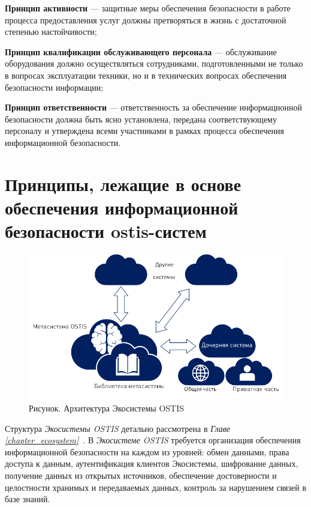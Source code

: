 \begin{textitemize}
	\item \textbf{Принцип активности} --- защитные меры обеспечения безопасности в работе процесса предоставления услуг должны претворяться в жизнь с достаточной степенью настойчивости;
	\item \textbf{Принцип квалификации обслуживающего персонала} --- обслуживание оборудования должно осуществляться сотрудниками, подготовленными не только в вопросах эксплуатации техники, но и в технических вопросах обеспечения безопасности информации;
	\item \textbf{Принцип ответственности} --- ответственность за обеспечение информационной безопасности должна быть ясно установлена, передана соответствующему персоналу и утверждена всеми участниками в рамках процесса обеспечения информационной безопасности.
\end{textitemize}

\section{Принципы, лежащие в основе обеспечения информационной безопасности ostis-систем}
\label{sec_security_principles}

\begin{figure}[H]
	\includegraphics[scale=0.9]{images/part7/chapter_security/ecosystem_security.png}
	\caption{Рисунок. Архитектура Экосистемы OSTIS}
	\label{fig:ecosystem_security}
\end{figure}

Структура \textit{Экосистемы OSTIS} детально рассмотрена в \textit{Главе \ref{chapter_ecosystem}~}.  В \textit{Экосистеме OSTIS} требуется организация обеспечения информационной безопасности на каждом из уровней: обмен данными, права доступа к данным, аутентификация клиентов Экосистемы, шифрование данных, получение данных из открытых источников, обеспечение достоверности и целостности хранимых и передаваемых данных, контроль за нарушением связей в базе знаний.

